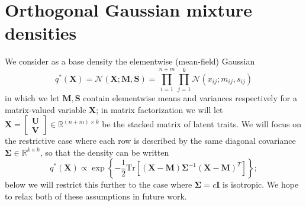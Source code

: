 \documentclass{article}
\newcommand{\N}{\mathcal{N}}
\newcommand{\Tr}{\text{Tr}}
\renewcommand{\v}[1]{\mathbf{#1}}
\newcommand{\I}{\v{I}}
\begin{document}
\newpage



\appendix 
\section{Orthogonal Gaussian mixture densities}
\label{sec:rot_density}

We consider as a base density the elementwise (mean-field) Gaussian
\[q^*(\v{X}) = \N\left(\v{X}; \v{M},  \v{S}\right)  = \prod_{i=1}^{n+m} \prod_{j=1}^k \N(x_{ij}; m_{ij}, s_{ij})\]
in which we let $\v{M}, \v{S}$ contain elementwise means and variances respectively for a
matrix-valued variable $\v{X}$; in matrix
factorization we will let $\v{X}= \left[\begin{array}{l}\v{U}\\\v{V}\end{array}\right] \in \mathbb{R}^{(n+m)\times k}$ be the stacked matrix of
latent traits. We will focus on the restrictive case where each row is described by the
same diagonal covariance $\v{\Sigma} \in \mathbb{R}^{k \times k}$, so that the density can be written
\[q^*(\v{X}) \propto \exp\left\{-\frac{1}{2}\Tr\left[(\v{X}-\v{M})\v{\Sigma}^{-1}(\v{X}-\v{M})^T\right]\right\};\]
 below we will restrict this further to the case where $\v{\Sigma} = c\I$
 is isotropic. We hope to relax both of these assumptions in future work. 
\end{document}
